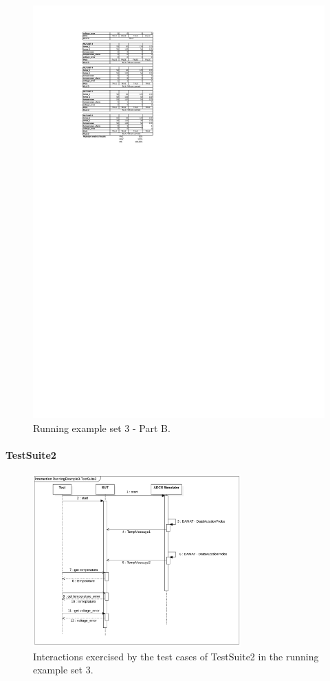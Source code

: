 \begin{figure}[tb]
\centering
\includegraphics[width=18cm]{damat/DataDrivenExample3B}
\caption{Running example set 3 - Part B.}
\label{fig:damat:RunningExample3B}
\end{figure}


\paragraph{TestSuite2}



\begin{figure}[tb]
\centering
\includegraphics[width=8cm]{damat/images/runningExamplesSequence3_2.png}
\caption{Interactions exercised by the test cases of TestSuite2 in the running example set 3.}
\label{fig:damat:RunningExample3Sequence2}
\end{figure}


